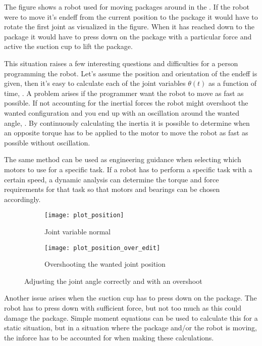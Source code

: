 The figure shows a robot used for moving packages around in the . If the robot were to move it's \gls{endeff} from the current position to the package it would have to rotate the first joint as visualized in the figure. When it has reached down to the package it would have to press down on the package with a particular force and active the suction cup to lift the package.

This situation raises a few interesting questions and difficulties for a person programming the robot. Let's assume the position and orientation of the \gls{endeff} is given, then it's easy to calculate each of the joint variables $\theta (t)$ as a function of time, . A problem arises if the programmer want the robot to move as fast as possible. If not accounting for the inertial forces the robot might overshoot the wanted configuration and you end up with an oscillation around the wanted angle, . By continuously calculating the inertia it is possible to determine when an opposite torque has to be applied to the motor to move the robot as fast as possible without oscillation.

The same method can be used as engineering guidance when selecting which motors to use for a specific task. If a robot has to perform a specific task with a certain speed, a dynamic analysis can determine the torque and force requirements for that task so that motors and bearings can be chosen accordingly.

\begin{figure}[ht!]
\begin{subfigure}{0.5\textwidth}
    \centering
    \texttt{[image: plot\_position]}
    \caption{Joint variable normal}
    \label{plot_position}
\end{subfigure}
\hfill
\begin{subfigure}{0.5\textwidth}
    \centering
    \texttt{[image: plot\_position\_over\_edit]}
    \caption{Overshooting the wanted joint position}
    \label{plot_position_over}
\end{subfigure}
\caption{Adjusting the joint angle correctly and with an overshoot}
\label{joint_position}
\end{figure}

Another issue arises when the suction cup has to press down on the package. The robot has to press down with sufficient force, but not too much as this could damage the package. Simple moment equations can be used to calculate this for a static situation, but in a situation where the package and/or the robot is moving, the \gls{inforce} has to be accounted for when making these calculations.

